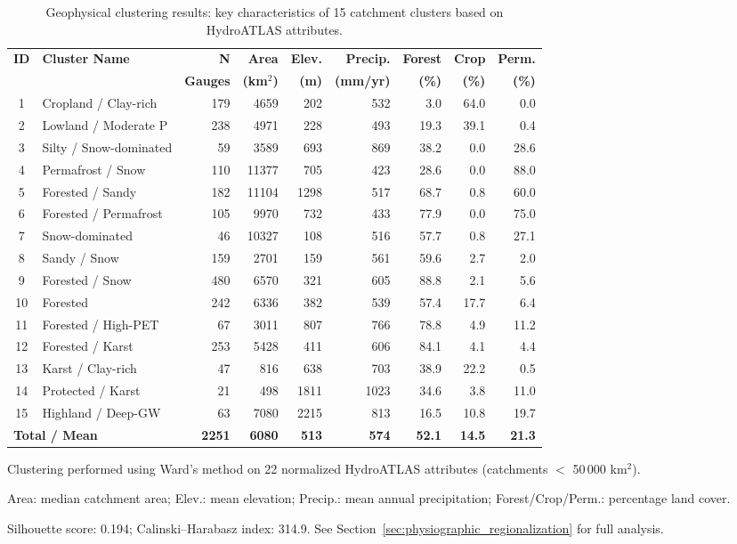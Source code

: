 \begin{table}[htbp]
\centering
\caption{Geophysical clustering results: key characteristics of 15 catchment clusters based on HydroATLAS attributes.}
\label{tab:geo_clusters}
\small
\begin{tabular}{clrrrrrrr}
\toprule
\textbf{ID} & \textbf{Cluster Name} & \textbf{N} & \textbf{Area} & \textbf{Elev.} & \textbf{Precip.} & \textbf{Forest} & \textbf{Crop} & \textbf{Perm.} \\
 &  & \textbf{Gauges} & \textbf{(km$^2$)} & \textbf{(m)} & \textbf{(mm/yr)} & \textbf{(\%)} & \textbf{(\%)} & \textbf{(\%)} \\
\midrule
1 & Cropland / Clay-rich & 179 & 4659 & 202 & 532 & 3.0 & 64.0 & 0.0 \\
2 & Lowland / Moderate P & 238 & 4971 & 228 & 493 & 19.3 & 39.1 & 0.4 \\
3 & Silty / Snow-dominated & 59 & 3589 & 693 & 869 & 38.2 & 0.0 & 28.6 \\
4 & Permafrost / Snow & 110 & 11377 & 705 & 423 & 28.6 & 0.0 & 88.0 \\
5 & Forested / Sandy & 182 & 11104 & 1298 & 517 & 68.7 & 0.8 & 60.0 \\
6 & Forested / Permafrost & 105 & 9970 & 732 & 433 & 77.9 & 0.0 & 75.0 \\
7 & Snow-dominated & 46 & 10327 & 108 & 516 & 57.7 & 0.8 & 27.1 \\
8 & Sandy / Snow & 159 & 2701 & 159 & 561 & 59.6 & 2.7 & 2.0 \\
9 & Forested / Snow & 480 & 6570 & 321 & 605 & 88.8 & 2.1 & 5.6 \\
10 & Forested & 242 & 6336 & 382 & 539 & 57.4 & 17.7 & 6.4 \\
11 & Forested / High-PET & 67 & 3011 & 807 & 766 & 78.8 & 4.9 & 11.2 \\
12 & Forested / Karst & 253 & 5428 & 411 & 606 & 84.1 & 4.1 & 4.4 \\
13 & Karst / Clay-rich & 47 & 816 & 638 & 703 & 38.9 & 22.2 & 0.5 \\
14 & Protected / Karst & 21 & 498 & 1811 & 1023 & 34.6 & 3.8 & 11.0 \\
15 & Highland / Deep-GW & 63 & 7080 & 2215 & 813 & 16.5 & 10.8 & 19.7 \\
\midrule
\multicolumn{2}{l}{\textbf{Total / Mean}} & \textbf{2251} & \textbf{6080} & \textbf{513} & \textbf{574} & \textbf{52.1} & \textbf{14.5} & \textbf{21.3} \\
\bottomrule
\end{tabular}
\begin{tablenotes}
\item Clustering performed using Ward's method on 22 normalized HydroATLAS attributes (catchments $<$ 50\,000 km$^2$).
\item Area: median catchment area; Elev.: mean elevation; Precip.: mean annual precipitation; Forest/Crop/Perm.: percentage land cover.
\item Silhouette score: 0.194; Calinski--Harabasz index: 314.9. See Section~\ref{sec:physiographic_regionalization} for full analysis.
\end{tablenotes}
\end{table}
